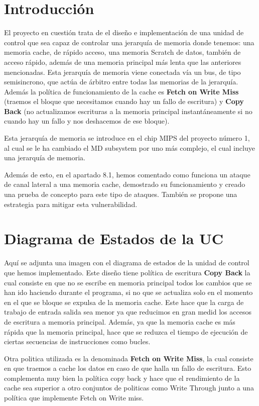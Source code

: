 \documentclass{article}
\begin{document}
\newpage

\tableofcontents

\newpage
\section{Introducción}
El proyecto en cuestión trata de el diseño e implementación de una unidad de control que sea capaz de controlar una jerarquía de memoria
donde tenemos: una memoria cache, de rápido acceso, una memoria Scratch de datos, también de acceso rápido, además de una memoria principal más lenta que las anteriores mencionadas.
Esta jerarquía de memoria viene conectada vía un bus, de tipo semisincrono, que actúa de árbitro entre todas las memorias de la jerarquía. Además la política de funcionamiento de la cache es \textbf{Fetch on Write Miss} (traemos el bloque que necesitamos cuando hay un fallo de escritura)
y \textbf{Copy Back} (no actualizamos escrituras a la memoria principal instantáneamente si no cuando hay un fallo y nos deshacemos de ese bloque). \par
Esta jerarquía de memoria se introduce en el chip MIPS del proyecto número 1, al cual se le ha cambiado el MD subsystem por uno más complejo, el cual incluye una jerarquía de memoria.\par
Además de esto, en el apartado 8.1, hemos comentado como funciona un ataque de canal lateral a una memoria cache, demostrado su funcionamiento y creado una prueba de concepto para este tipo de ataques. También se propone una estrategia para mitigar esta vulnerabilidad.

\section{Diagrama de Estados de la UC}
Aquí se adjunta una imagen con el diagrama de estados de la unidad de control que hemos implementado. Este diseño tiene política de escritura \textbf{Copy Back} la cual consiste
en que no se escribe en memoria principal todos los cambios que se han ido haciendo durante el programa, si no que se actualiza solo en el momento en el que se bloque se expulsa
de la memoria cache. Este hace que la carga de trabajo de entrada salida sea menor ya que reducimos en gran medid los accesos de escritura a memoria principal. Además, ya que la 
memoria cache es más rápida que la memoria principal, hace que se reduzca el tiempo de ejecución de ciertas secuencias de instrucciones como bucles.\par
Otra politica utilizada es la denominada \textbf{Fetch on Write Miss}, la cual consiste en que traemos a cache los datos en caso de que halla un fallo de escritura. Esto complementa
muy bien la política copy back y hace que el rendimiento de la cache sea superior a otro conjuntos de politicas como Write Through junto a una política que implemente Fetch on Write miss.\par
\end{document}
